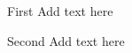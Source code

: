 \documentclass{ieeeaccess}
\begin{document}
\begin{thebibliography}{00}
\end{thebibliography}

\begin{IEEEbiographynophoto}{First} Add text here
\end{IEEEbiographynophoto}

\begin{IEEEbiographynophoto}{Second} Add text here
\end{IEEEbiographynophoto}

\EOD
\end{document}
